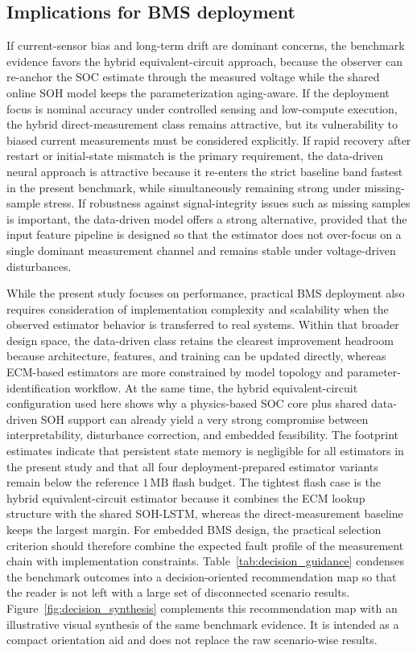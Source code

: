 \documentclass[review,nopreprintline]{elsarticle}
\begin{document}
\subsection{Implications for BMS deployment}
If current-sensor bias and long-term drift are dominant concerns, the benchmark evidence favors the hybrid equivalent-circuit approach, because the observer can re-anchor the SOC estimate through the measured voltage while the shared online SOH model keeps the parameterization aging-aware. If the deployment focus is nominal accuracy under controlled sensing and low-compute execution, the hybrid direct-measurement class remains attractive, but its vulnerability to biased current measurements must be considered explicitly. If rapid recovery after restart or initial-state mismatch is the primary requirement, the data-driven neural approach is attractive because it re-enters the strict baseline band fastest in the present benchmark, while simultaneously remaining strong under missing-sample stress. If robustness against signal-integrity issues such as missing samples is important, the data-driven model offers a strong alternative, provided that the input feature pipeline is designed so that the estimator does not over-focus on a single dominant measurement channel and remains stable under voltage-driven disturbances.

While the present study focuses on performance, practical BMS deployment also requires consideration of implementation complexity and scalability when the observed estimator behavior is transferred to real systems. Within that broader design space, the data-driven class retains the clearest improvement headroom because architecture, features, and training can be updated directly, whereas ECM-based estimators are more constrained by model topology and parameter-identification workflow. At the same time, the hybrid equivalent-circuit configuration used here shows why a physics-based SOC core plus shared data-driven SOH support can already yield a very strong compromise between interpretability, disturbance correction, and embedded feasibility. The footprint estimates indicate that persistent state memory is negligible for all estimators in the present study and that all four deployment-prepared estimator variants remain below the reference $1\,\mathrm{MB}$ flash budget. The tightest flash case is the hybrid equivalent-circuit estimator because it combines the ECM lookup structure with the shared SOH-LSTM, whereas the direct-measurement baseline keeps the largest margin. For embedded BMS design, the practical selection criterion should therefore combine the expected fault profile of the measurement chain with implementation constraints. Table~\ref{tab:decision_guidance} condenses the benchmark outcomes into a decision-oriented recommendation map so that the reader is not left with a large set of disconnected scenario results. Figure~\ref{fig:decision_synthesis} complements this recommendation map with an illustrative visual synthesis of the same benchmark evidence. It is intended as a compact orientation aid and does not replace the raw scenario-wise results.
\end{document}
